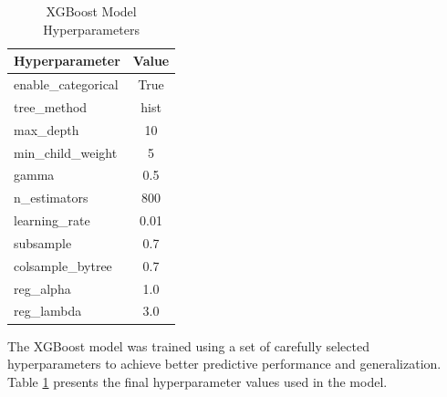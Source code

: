 \documentclass[12pt, a4paper]{report}
\numberwithin{figure}{chapter}
\numberwithin{table}{chapter}
\numberwithin{equation}{chapter}
\begin{document}
\begin{table}[H]
\centering
\caption{XGBoost Model Hyperparameters}
\label{tab:xgb-hyperparams}
\begin{tabular}{|l|c|}
\hline
\textbf{Hyperparameter} & \textbf{Value} \\
\hline
enable\_categorical & True \\
\hline
tree\_method & hist \\
\hline
max\_depth & 10 \\
\hline
min\_child\_weight & 5 \\
\hline
gamma & 0.5 \\
\hline
n\_estimators & 800 \\
\hline
learning\_rate & 0.01 \\
\hline
subsample & 0.7 \\
\hline
colsample\_bytree & 0.7 \\
\hline
reg\_alpha & 1.0 \\
\hline
reg\_lambda & 3.0 \\
\hline
\end{tabular}
\end{table}
The XGBoost model was trained using a set of carefully selected hyperparameters to achieve better predictive performance and generalization. Table \ref{tab:xgb-hyperparams} presents the final hyperparameter values used in the model.
\end{document}
